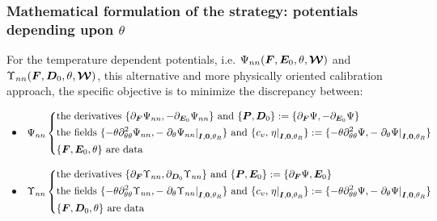 \subsubsection{Mathematical formulation of the strategy: potentials depending upon $\theta$}\label{sec:strategy 2 theta}

For the temperature dependent potentials, i.e.  $\Psi_{nn}(\boldsymbol{F},\boldsymbol{E}_0,\theta,\boldsymbol{\mathcal{W}})$ and $\Upsilon_{nn}(\boldsymbol{F},\boldsymbol{D}_0,\theta,\boldsymbol{\mathcal{W}})$, this  alternative and more physically oriented calibration approach,  the specific objective is to minimize the discrepancy between: 
%
\begin{itemize}
	\item    \(
	\Psi_{nn}\left\{
	\begin{aligned}
	&\text{the derivatives } \{\partial_{\boldsymbol{F}}\Psi_{nn},-\partial_{\boldsymbol{E}_0}\Psi_{nn}\} \text{ and } \{\boldsymbol{P},\boldsymbol{D}_0\}:=\{\partial_{\boldsymbol{F}}\Psi,-\partial_{\boldsymbol{E}_0}\Psi\}\\
	&\text{the fields } \{-\theta\partial^2_{\theta\theta}\Psi_{nn},-\left.\partial_{\theta}\Psi_{nn}\right\vert_{\boldsymbol{I},\boldsymbol{0},\theta_R}\} \text{ and } \{c_v,\left.\eta\right\vert_{\boldsymbol{I},\boldsymbol{0},\theta_R}\}:=\{-\theta\partial^2_{\theta\theta}\Psi,-\left.\partial_{\theta}\Psi\right\vert_{\boldsymbol{I},\boldsymbol{0},\theta_R}\}\\
	&\{\boldsymbol{F},\boldsymbol{E}_0,\theta\} \text{ are data }
	\end{aligned}
	\right.
	\)
	
	
 
	\item  \(
	\Upsilon_{nn}\left\{
	\begin{aligned}
	&\text{the derivatives }  \{\partial_{\vect{F}}\Upsilon_{nn},\partial_{\vect{D}_0}\Upsilon_{nn}\} \text{ and } \{\vect{P},\vect{E}_0\}:=\{\partial_{\vect{F}}\Psi,{\vect{E}_0}\}	\\
	&\text{the fields } \{-\theta\partial^2_{\theta\theta}\Upsilon_{nn},-\left.\partial_{\theta}\Upsilon_{nn}\right\vert_{\vect{I},\vect{0},\theta_R}\} \text{ and } \{c_v,\left.\eta\right\vert_{\vect{I},\vect{0},\theta_R}\}:=\{-\theta\partial^2_{\theta\theta}\Psi,-\left.\partial_{\theta}\Psi\right\vert_{\vect{I},\vect{0},\theta_R}\}\\
%
&\{\vect{F},\vect{D}_0,\theta\} \text{ are data }	
 	\end{aligned}
\right.
\)	
	
	

		
		
			
\end{itemize}
%


